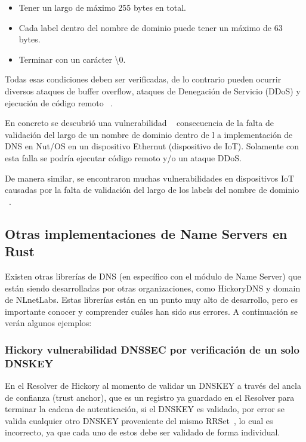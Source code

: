 \begin{itemize}
\item Tener un largo de máximo 255 bytes en total.
\item Cada label dentro del nombre de dominio puede tener un máximo de 63 bytes.
\item Terminar con un carácter \textbackslash 0.
\end{itemize}

Todas esas condiciones deben ser verificadas, de lo contrario pueden ocurrir diversos ataques de buffer overflow, ataques de Denegación de 
Servicio (DDoS) y ejecución de código remoto ~\cite{AtaquesRFC}.

En concreto se descubrió una vulnerabilidad ~\cite{Ethernut} consecuencia de la falta de validación del largo de un nombre de dominio dentro de l
a implementación de DNS en Nut/OS en un dispositivo Ethernut (dispositivo de IoT). Solamente con esta falla se podría ejecutar código remoto y/o 
un ataque DDoS.

De manera similar, se encontraron muchas vulnerabilidades en dispositivos IoT causadas por la falta de validación del largo de los labels del 
nombre de dominio ~\cite{LabelsIOT}.

\subsection{Otras implementaciones de Name Servers en Rust}

Existen otras librerías de DNS (en específico con el módulo de Name Server) que están siendo desarrolladas por otras organizaciones, como 
HickoryDNS \cite{HickoryDNS} y domain\cite{NLnetLabs} de NLnetLabs. Estas librerías están en un punto muy alto de desarrollo, pero es 
importante conocer y comprender cuáles han sido sus errores. A continuación se verán algunos ejemplos:

\subsubsection{Hickory vulnerabilidad DNSSEC por verificación de un solo DNSKEY}

En el Resolver de Hickory al momento de validar un DNSKEY a través del ancla de confianza (trust anchor), que es un registro ya guardado en el 
Resolver para terminar la cadena de autenticación, si el DNSKEY es validado, por error se valida cualquier otro DNSKEY proveniente del mismo 
RRSet~\cite{HickoryBug}, lo cual es incorrecto, ya que cada uno de estos debe ser validado de forma individual.



